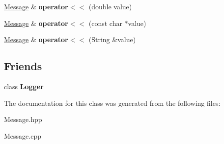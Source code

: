 \begin{DoxyCompactItemize}
\mbox{\label{classService_1_1Logging_1_1Message_afa99220819f6aacdacb3f0b5ada23b17}} 
\mbox{\hyperlink{classService_1_1Logging_1_1Message}{Message}} \& {\bfseries operator$<$$<$} (double value)
\item 
\mbox{\label{classService_1_1Logging_1_1Message_a392eef58084ef91eb37e8ede65d720b2}} 
\mbox{\hyperlink{classService_1_1Logging_1_1Message}{Message}} \& {\bfseries operator$<$$<$} (const char $\ast$value)
\item 
\mbox{\label{classService_1_1Logging_1_1Message_a31bfff0126a1ef260cd01995fc0aeda8}} 
\mbox{\hyperlink{classService_1_1Logging_1_1Message}{Message}} \& {\bfseries operator$<$$<$} (String \&value)
\end{DoxyCompactItemize}
\subsection*{Friends}
\begin{DoxyCompactItemize}
\item 
\mbox{\label{classService_1_1Logging_1_1Message_aff02b76416d2846736b7ecd798921a0a}} 
class {\bfseries Logger}
\end{DoxyCompactItemize}


The documentation for this class was generated from the following files\+:\begin{DoxyCompactItemize}
\item 
Message.\+hpp\item 
Message.\+cpp\end{DoxyCompactItemize}
